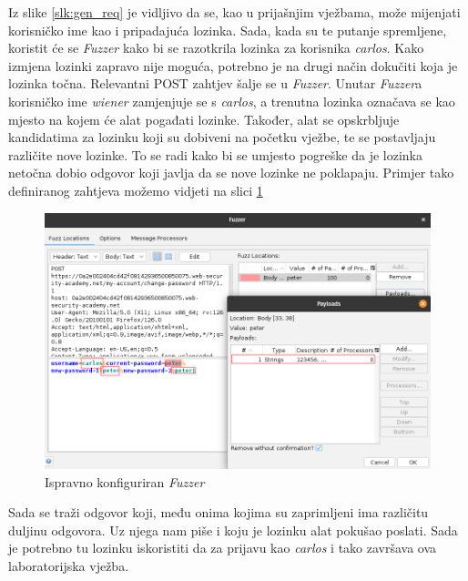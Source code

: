 Iz slike \ref{slk:gen_req} je vidljivo da se, kao u prijašnjim vježbama, može mijenjati korisničko ime kao i pripadajuća lozinka. 
Sada, kada su te putanje spremljene, koristit će se \textit{Fuzzer} kako bi se razotkrila lozinka za korisnika \textit{carlos}. 
Kako izmjena lozinki zapravo nije moguća, potrebno je na drugi način dokučiti koja je lozinka točna.
Relevantni POST zahtjev šalje se u \textit{Fuzzer}. 
Unutar \textit{Fuzzer}a korisničko ime \textit{wiener} zamjenjuje se s \textit{carlos}, a trenutna lozinka označava se kao mjesto na kojem će alat pogađati lozinke. 
Također, alat se opskrbljuje kandidatima za lozinku koji su dobiveni na početku vježbe, te se postavljaju različite nove lozinke. 
To se radi kako bi se umjesto pogreške da je lozinka netočna dobio odgovor koji javlja da se nove lozinke ne poklapaju. 
Primjer tako definiranog zahtjeva možemo vidjeti na slici \ref{slk:full_config_fuzz_zap}

\begin{figure}[H]
  \centering
  \includegraphics[width=1\textwidth]{slike/zap_fuzz_pass.png}
  \caption{Ispravno konfiguriran \textit{Fuzzer}}
  \label{slk:full_config_fuzz_zap}
\end{figure}

Sada se traži odgovor koji, među onima kojima su zaprimljeni ima različitu duljinu odgovora. 
Uz njega nam piše i koju je lozinku alat pokušao poslati. 
Sada je potrebno tu lozinku iskoristiti da za prijavu kao \textit{carlos} i tako završava ova laboratorijska vježba.

\newpage %
